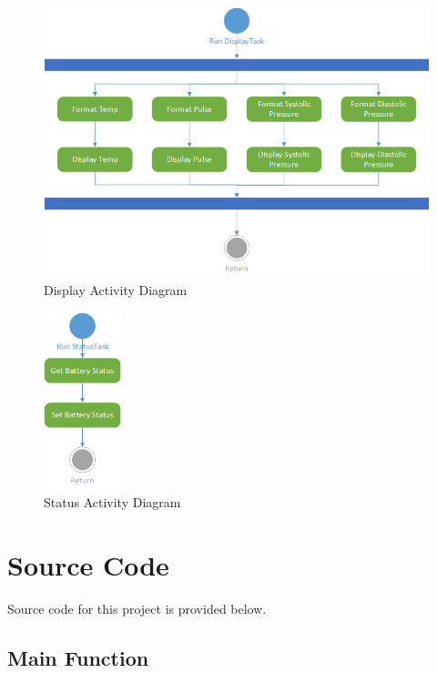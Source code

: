 \documentclass[12pt]{article} %
\begin{document}
\begin{figure}
  \centering
  \includegraphics[width=\textwidth]{../design/display_activity.png}
  \caption{Display Activity Diagram}
  \label{fig:displayActivity}
\end{figure}

\begin{figure}
  \centering
  \includegraphics[width=0.2\textwidth]{../design/Status_activity.png}
  \caption{Status Activity Diagram}
  \label{fig:statusActivity}
\end{figure}

\pagebreak

\section{Source Code}

Source code for this project is provided below.

\subsection{Main Function}

\end{document}
